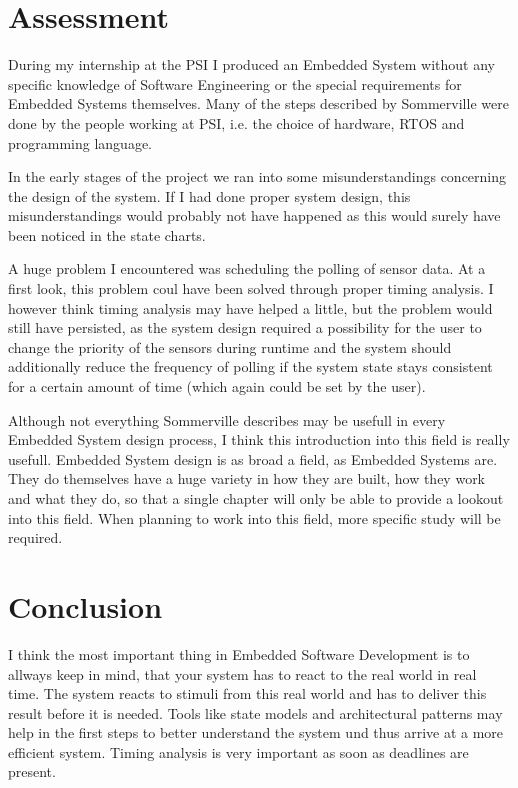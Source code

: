 \documentclass[10pt,a4paper,titlepage,draft]{article} %
\begin{document}
\section{Assessment}
During my internship at the PSI I produced an Embedded System without any specific knowledge of Software Engineering or the special requirements for Embedded Systems themselves.
Many of the steps described by Sommerville were done by the people working at PSI, i.e. the choice of hardware, RTOS and programming language.

In the early stages of the project we ran into some misunderstandings concerning the design of the system. If I had done proper system design, this misunderstandings would probably not have happened as this would surely have been noticed in the state charts.

A huge problem I encountered was scheduling the polling of sensor data.
At a first look, this problem coul have been solved through proper timing analysis.
I however think timing analysis may have helped a little, but the problem would still have persisted, as the system design required a possibility for the user to change the priority of the sensors during runtime and the system should additionally reduce the frequency of polling if the system state stays consistent for a certain amount of time (which again could be set by the user).

Although not everything Sommerville describes may be usefull in every Embedded System design process, I think this introduction into this field is really usefull.
Embedded System design is as broad a field, as Embedded Systems are.
They do themselves have a huge variety in how they are built, how they work and what they do, so that a single chapter will only be able to provide a lookout into this field.
When planning to work into this field, more specific study will be required.

\section{Conclusion}
I think the most important thing in Embedded Software Development is to allways keep in mind, that your system has to react to the real world in real time. The system reacts to stimuli from this real world and has to deliver this result before it is needed. Tools like state models and architectural patterns may help in the first steps to better understand the system und thus arrive at a more efficient system. Timing analysis is very important as soon as deadlines are present.
\end{document}

